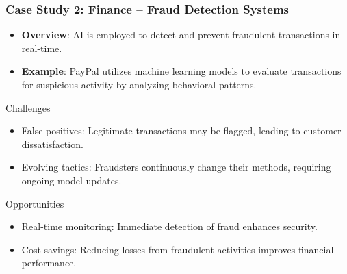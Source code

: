 \documentclass{beamer}
\begin{document}
\begin{frame}[fragile]
    \frametitle{Case Study 2: Finance – Fraud Detection Systems}
    \begin{itemize}
        \item \textbf{Overview}: AI is employed to detect and prevent fraudulent transactions in real-time.
        \item \textbf{Example}: PayPal utilizes machine learning models to evaluate transactions for suspicious activity by analyzing behavioral patterns.
    \end{itemize}

    \begin{block}{Challenges}
        \begin{itemize}
            \item False positives: Legitimate transactions may be flagged, leading to customer dissatisfaction.
            \item Evolving tactics: Fraudsters continuously change their methods, requiring ongoing model updates.
        \end{itemize}
    \end{block}

    \begin{block}{Opportunities}
        \begin{itemize}
            \item Real-time monitoring: Immediate detection of fraud enhances security.
            \item Cost savings: Reducing losses from fraudulent activities improves financial performance.
        \end{itemize}
    \end{block}
\end{frame}
\end{document}
